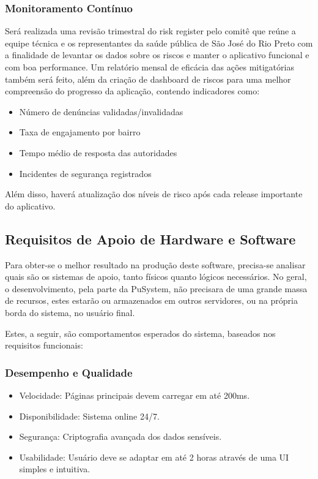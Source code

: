 \documentclass[a4paper, 12pt]{article}
\begin{document}
\subsubsection{Monitoramento Contínuo}
    Será realizada uma revisão trimestral do risk register pelo comitê que reúne a equipe técnica e os representantes da saúde pública de São José do Rio Preto com a finalidade de levantar os dados sobre os riscos e manter o aplicativo funcional e com boa performance. 
    Um relatório mensal de eficácia das ações mitigatórias também será feito, além da criação de dashboard de riscos para uma melhor compreensão do progresso da aplicação, contendo indicadores como: 
    \begin{itemize}
        \item Número de denúncias validadas/invalidadas
        \item Taxa de engajamento por bairro
        \item Tempo médio de resposta das autoridades
        \item Incidentes de segurança registrados
    \end{itemize}
    Além disso, haverá atualização dos níveis de risco após cada release importante do aplicativo.



\subsection{Requisitos de Apoio de Hardware e Software}

Para obter-se o melhor resultado na produção deste software, precisa-se analisar quais são os sistemas de apoio, tanto físicos quanto lógicos necessários. No geral, o desenvolvimento, pela parte da PuSystem, não precisara de uma grande massa de recursos, estes estarão ou armazenados em outros servidores, ou na própria borda do sistema, no usuário final. 

Estes, a seguir, são comportamentos esperados do sistema, baseados nos requisitos funcionais: 

\subsubsection{Desempenho e Qualidade}
\begin{itemize}[]
  \item Velocidade: Páginas principais devem carregar em até 200ms.
  \item Disponibilidade: Sistema online 24/7.
  \item Segurança: Criptografia avançada dos dados sensíveis.
  \item Usabilidade: Usuário deve se adaptar em até 2 horas através de uma UI simples e intuitiva.
\end{itemize}
\end{document}
